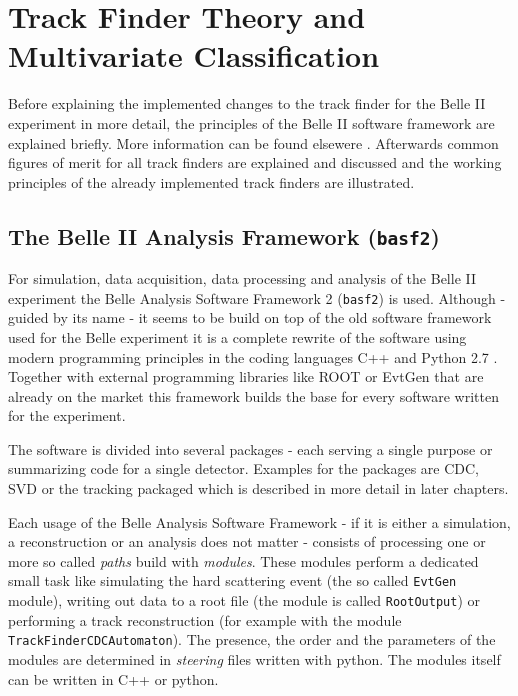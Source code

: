 \chapter{Track Finder Theory and Multivariate Classification}

Before explaining the implemented changes to the track finder for the Belle II experiment in more detail, the principles of the Belle II software framework are explained briefly. More information can be found elsewere . Afterwards common figures of merit for all track finders are explained and discussed and the working principles of the already implemented track finders are illustrated. 

\section{The Belle II Analysis Framework (\texttt{basf2})}

For simulation, data acquisition, data processing and analysis of the Belle II experiment the Belle Analysis Software Framework 2 (\texttt{basf2}) is used. Although - guided by its name - it seems to be build on top of the old software framework used for the Belle experiment it is a complete rewrite of the software using modern programming principles in the coding languages C++ \cite{cpp} and Python 2.7 \cite{python}. Together with external programming libraries like ROOT \cite{root} or EvtGen \cite{evtgen} that are already on the market this framework builds the base for every software written for the experiment.

The software is divided into several packages - each serving a single purpose or summarizing code for a single detector. Examples for the packages are CDC, SVD or the tracking packaged which is described in more detail in later chapters.

Each usage of the Belle Analysis Software Framework - if it is either a simulation, a reconstruction or an analysis does not matter - consists of processing one or more so called \emph{paths} build with \emph{modules}. These modules perform a dedicated small task like simulating the hard scattering event (the so called \texttt{EvtGen} module), writing out data to a root file (the module is called \texttt{RootOutput}) or performing a track reconstruction (for example with the module \texttt{TrackFinderCDCAutomaton}). The presence, the order and the parameters of the modules are determined in \emph{steering} files written with python. The modules itself can be written in C++ or python. 

